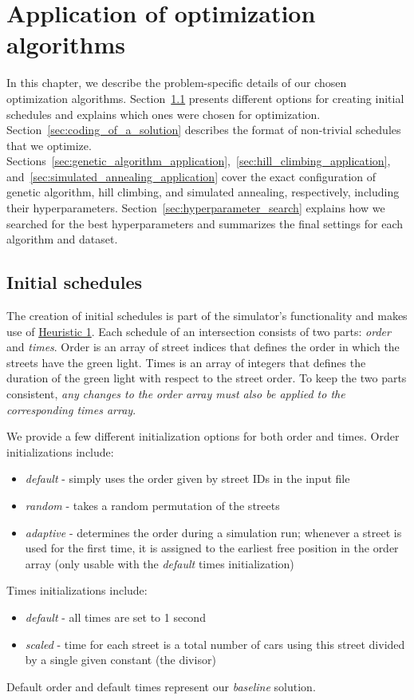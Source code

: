 \chapter{Application of optimization algorithms}

In this chapter, we describe the problem-specific details of our chosen optimization algorithms. Section~\ref{sec:initial_schedules} presents different options for creating initial schedules and explains which ones were chosen for optimization. Section~\ref{sec:coding_of_a_solution} describes the format of non-trivial schedules that we optimize. Sections~\ref{sec:genetic_algorithm_application},~\ref{sec:hill_climbing_application}, and~\ref{sec:simulated_annealing_application} cover the exact configuration of genetic algorithm, hill climbing, and simulated annealing, respectively, including their hyperparameters. Section~\ref{sec:hyperparameter_search} explains how we searched for the best hyperparameters and summarizes the final settings for each algorithm and dataset.

\section{Initial schedules} \label{sec:initial_schedules}

The creation of initial schedules is part of the simulator's functionality and makes use of \hyperref[para:heuristic_1]{Heuristic 1}.
Each schedule of an intersection consists of two parts: \textit{order} and \textit{times}. Order is an array of street indices that defines the order in which the streets have the green light. Times is an array of integers that defines the duration of the green light with respect to the street order. To keep the two parts consistent, \textit{any changes to the order array must also be applied to the corresponding times array}.

We provide a few different initialization options for both order and times. Order initializations include:
\begin{itemize}
    \item \textit{default} - simply uses the order given by street IDs in the input file
    \item \textit{random} - takes a random permutation of the streets
    \item \textit{adaptive} - determines the order during a simulation run; whenever a street is used for the first time, it is assigned to the earliest free position in the order array (only usable with the \textit{default} times initialization)
\end{itemize}
Times initializations include:
\begin{itemize}
    \item \textit{default} - all times are set to 1 second
    \item \textit{scaled} - time for each street is a total number of cars using this street divided by a single given constant (the divisor)
\end{itemize}
Default order and default times represent our \textit{baseline} solution.

